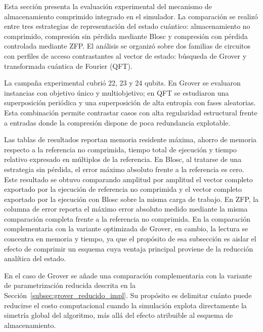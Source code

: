 Esta sección presenta la evaluación experimental del mecanismo de almacenamiento comprimido
integrado en el simulador. La comparación se realizó entre tres estrategias de representación
del estado cuántico: almacenamiento no comprimido, compresión sin pérdida mediante Blosc y
compresión con pérdida controlada mediante ZFP. El análisis se organizó sobre dos familias de
circuitos con perfiles de acceso contrastantes al vector de estado: búsqueda de Grover y
transformada cuántica de Fourier (QFT).

La campaña experimental cubrió 22, 23 y 24 qubits. En Grover se evaluaron instancias con
objetivo único y multiobjetivo; en QFT se estudiaron una superposición periódica y una
superposición de alta entropía con fases aleatorias. Esta combinación permite contrastar
casos con alta regularidad estructural frente a entradas donde la compresión dispone de poca
redundancia explotable.

Las tablas de resultados reportan memoria residente máxima, ahorro de memoria respecto a la
referencia no comprimida, tiempo total de ejecución y tiempo relativo expresado en múltiplos
de la referencia. En Blosc, al tratarse de una estrategia sin pérdida, el error máximo
absoluto frente a la referencia es cero. Este resultado se obtuvo comparando amplitud por
amplitud el vector completo exportado por la ejecución de referencia no comprimida y el vector completo exportado
por la ejecución con Blosc sobre la misma carga de trabajo. En ZFP, la columna de error
reporta el máximo error absoluto medido mediante la misma comparación completa frente a la
referencia no comprimida. En la comparación complementaria con la
variante optimizada de Grover, en cambio, la lectura se concentra en memoria y tiempo, ya que
el propósito de esa subsección es aislar el efecto de comprimir un esquema cuya ventaja
principal proviene de la reducción analítica del estado.

En el caso de Grover se añade una comparación complementaria con la variante de
parametrización reducida descrita en la Sección~\ref{subsec:grover_reducido_impl}. Su
propósito es delimitar cuánto puede reducirse el costo computacional cuando la simulación
explota directamente la simetría global del algoritmo, más allá del efecto atribuible al
esquema de almacenamiento.
